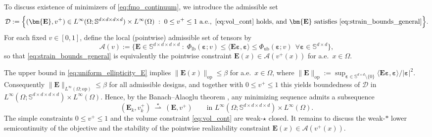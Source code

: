 \documentclass[preprint,3p]{elsarticle}
\newcommand{\tens}[1]{\bm{\mathit{#1}}}             %
\newcommand{\tenss}[1]{\bm{\mathbf{#1}}}            %
\newcommand{\tensf}[1]{\bm{\mathbf{#1}}}            %
\newcommand{\strain}{\tenss{\varepsilon}}           %
\begin{document}
To discuss existence of minimizers of \eqref{eq:fmo_continuum}, we introduce the admissible set
%
\begin{equation}\label{eq:admissible_set_D}
\mathcal{D}
:=\Big\{(\tensf{E},v^+)\in L^\infty(\Omega;\mathbb{S}^{d\times d\times d\times d})\times L^\infty(\Omega)\;:\;
0\le v^+\le 1\ \text{a.e.},\ \eqref{eq:vol_cont}\ \text{holds, and }\tensf{E}\ \text{satisfies }\eqref{eq:strain_bounds_general}\Big\}.
\end{equation}
%
For each fixed $v\in[0,1]$, define the local (pointwise) admissible set of tensors by
%
\begin{equation}\label{eq:local_admissible_set}
\mathcal{A}(v)
:=\Big\{\tensf{E}\in\mathbb{S}^{d\times d\times d\times d}\;:\;
\Phi_{\mathrm{lb}}(\strain;v)\le \langle\tensf{E}\strain,\strain\rangle\le \Phi_{\mathrm{ub}}(\strain;v)\ \ \forall \strain\in\mathbb{S}^{d\times d}\Big\},
\end{equation}
%
so that \eqref{eq:strain_bounds_general} is equivalently the pointwise constraint $\tensf{E}(\tens{x})\in \mathcal{A}(v^+(\tens{x}))$ for a.e.\ $\tens{x}\in\Omega$.

The upper bound in \eqref{eq:uniform_ellipticity_E} implies $\lVert\tensf{E}(\tens{x})\rVert_{\mathrm{op}}\le \beta$ for a.e.\ $\tens{x}\in\Omega$, where $\lVert\tensf{E}\rVert_{\mathrm{op}}:=\sup_{\strain\in\mathbb{S}^{d\times d}\setminus\{0\}} \langle\tensf{E}\strain,\strain\rangle/\lvert\strain\rvert^2$. Consequently $\lVert\tensf{E}\rVert_{L^\infty(\Omega;\mathrm{op})}\le \beta$ for all admissible designs, and together with $0\le v^+\le 1$ this yields boundedness of $\mathcal{D}$ in $L^\infty(\Omega;\mathbb{S}^{d\times d\times d\times d})\times L^\infty(\Omega)$. Hence, by the Banach--Alaoglu theorem \citep[Theorem 3.16]{Brezis2011}, any minimizing sequence admits a subsequence
%
\begin{equation}\label{eq:weak_star_subsequence}
(\tensf{E}_k,v_k^+)\ \overset{\star}{\rightharpoonup}\ (\tensf{E},v^+)
\qquad\text{in }L^\infty(\Omega;\mathbb{S}^{d\times d\times d\times d})\times L^\infty(\Omega).
\end{equation}
%
The simple constraints $0\le v^+\le 1$ and the volume constraint \eqref{eq:vol_cont} are weak-$\star$ closed. It remains to discuss the weak-$\ast$ lower semicontinuity of the objective and the stability of the pointwise realizability constraint
$\tensf{E}(\tens{x})\in\mathcal{A}(v^+(\tens{x}))$.
\end{document}
